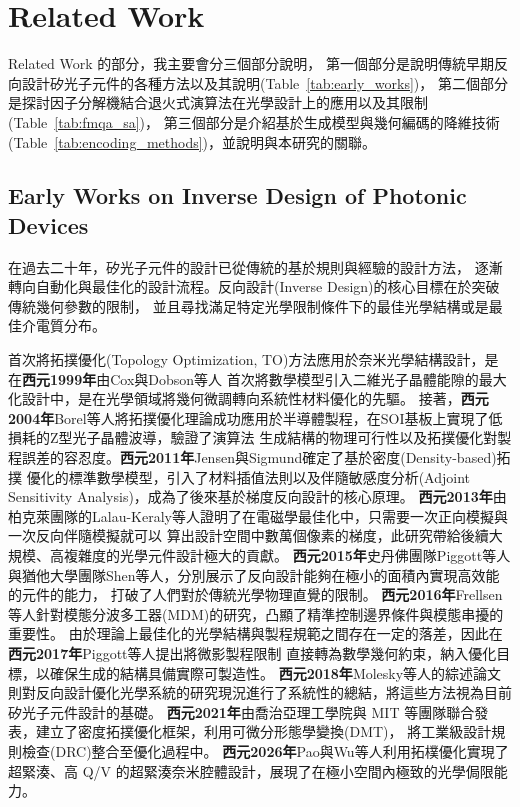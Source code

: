 \chapter{Related Work}
\label{ch:relatedwork}
Related Work 的部分，我主要會分三個部分說明，
第一個部分是說明傳統早期反向設計矽光子元件的各種方法以及其說明(Table~\ref{tab:early_works})，
第二個部分是探討因子分解機結合退火式演算法在光學設計上的應用以及其限制(Table~\ref{tab:fmqa_sa})，
第三個部分是介紹基於生成模型與幾何編碼的降維技術(Table~\ref{tab:encoding_methods})，並說明與本研究的關聯。

\section{Early Works on Inverse Design of Photonic Devices}
在過去二十年，矽光子元件的設計已從傳統的基於規則與經驗的設計方法，
逐漸轉向自動化與最佳化的設計流程。反向設計(Inverse Design)的核心目標在於突破傳統幾何參數的限制，
並且尋找滿足特定光學限制條件下的最佳光學結構或是最佳介電質分布。\

首次將拓撲優化(Topology Optimization, TO)方法應用於奈米光學結構設計，是在\cite{cox1999_maximizing}\textbf{西元1999年}由Cox與Dobson等人
首次將數學模型引入二維光子晶體能隙的最大化設計中，是在光學領域將幾何微調轉向系統性材料優化的先驅。
接著，\cite{borel2004_topology}\textbf{西元2004年}Borel等人將拓撲優化理論成功應用於半導體製程，在SOI基板上實現了低損耗的Z型光子晶體波導，驗證了演算法
生成結構的物理可行性以及拓撲優化對製程誤差的容忍度。\cite{jensen2011_topology}\textbf{西元2011年}Jensen與Sigmund確定了基於密度(Density-based)拓撲
優化的標準數學模型，引入了材料插值法則以及伴隨敏感度分析(Adjoint Sensitivity Analysis)，成為了後來基於梯度反向設計的核心原理。
\cite{lalaukeraly2013_adjoint}\textbf{西元2013年}由柏克萊團隊的Lalau-Keraly等人證明了在電磁學最佳化中，只需要一次正向模擬與一次反向伴隨模擬就可以
算出設計空間中數萬個像素的梯度，此研究帶給後續大規模、高複雜度的光學元件設計極大的貢獻。
\textbf{西元2015年}\cite{piggott2015_inverse_design}史丹佛團隊Piggott等人與\cite{shen2015_integrated_pbs}猶他大學團隊Shen等人，分別展示了反向設計能夠在極小的面積內實現高效能的元件的能力，
打破了人們對於傳統光學物理直覺的限制。
\cite{frellsen2016_topology_mdm}\textbf{西元2016年}Frellsen等人針對模態分波多工器(MDM)的研究，凸顯了精準控制邊界條件與模態串擾的重要性。
由於理論上最佳化的光學結構與製程規範之間存在一定的落差，因此在\cite{piggott2017_fabrication}\textbf{西元2017年}Piggott等人提出將微影製程限制
直接轉為數學幾何約束，納入優化目標，以確保生成的結構具備實際可製造性。
\cite{molesky2018_inverse}\textbf{西元2018年}Molesky等人的綜述論文則對反向設計優化光學系統的研究現況進行了系統性的總結，將這些方法視為目前矽光子元件設計的基礎。
\cite{hammond2021_photonic}\textbf{西元2021年}由喬治亞理工學院與 MIT 等團隊聯合發表，建立了密度拓撲優化框架，利用可微分形態學變換(DMT)，
將工業級設計規則檢查(DRC)整合至優化過程中。
\cite{pao2026_nano}	\textbf{西元2026年}Pao與Wu等人利用拓樸優化實現了超緊湊、高 Q/V 的超緊湊奈米腔體設計，展現了在極小空間內極致的光學侷限能力。

